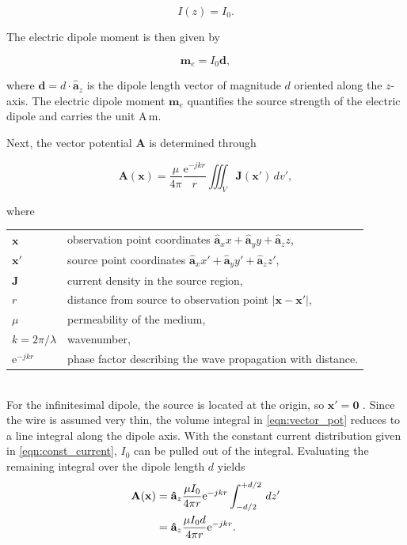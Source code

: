 \begin{equation}\label{eqn:const_current}
	{I}(z) = I_0.
\end{equation}

The electric dipole moment is then given by

\begin{equation}
	\mathbf{m}_e = I_0 \mathbf{d},
	\label{eqn:m_e_def}
\end{equation}

where $\mathbf{d} = d \cdot \hat{\mathbf{a}}_z$ is the dipole length 
vector of magnitude $d$ oriented along the $z$-axis. The electric dipole 
moment $\mathbf{m}_e$ quantifies the source strength of the electric 
dipole and carries the unit $\mathrm{A}\,\mathrm{m}$.

Next, the vector potential $\mathbf{A}$ is determined through

\begin{equation}
	\mathbf{A}(\mathbf{x})=\frac{\mu}{4\pi}\frac{\mathrm{e}^{-jkr}}{r}\iiint_V \mathbf{J}(\mathbf{x'})\,dv',
	\label{eqn:vector_pot}
\end{equation}

where\\[0.5em]
\begin{tabular}{p{3.5cm}l}
	$\mathbf{x}$            & observation point coordinates $\mathbf{\hat{a}}_x x + \mathbf{\hat{a}}_y y + \mathbf{\hat{a}}_z z$, \\[0.3em]
	$\mathbf{x'}$           & source point coordinates $\mathbf{\hat{a}}_x x' + \mathbf{\hat{a}}_y y' + \mathbf{\hat{a}}_z z'$, \\[0.3em]
	$\mathbf{J}$            & current density in the source region, \\[0.3em]
	$r$                     & distance from source to observation point $|\mathbf{x} - \mathbf{x'}|$, \\[0.3em]
	$\mu$                   & permeability of the medium, \\[0.3em]
	$k = 2\pi/\lambda$\hspace{2cm}      & wavenumber, \\[0.3em]
	$\mathrm{e}^{-jkr}$      & phase factor describing the wave propagation with distance.
\end{tabular}\\

For the infinitesimal dipole, the source is located at the origin, so $\mathbf{x'}=\mathbf{0}$ \cite[p.~152]{Balanis_1997}. Since the wire is assumed very thin, the volume integral in \eqref{eqn:vector_pot} reduces to a line integral along the dipole axis. With the constant current distribution 
given in \eqref{eqn:const_current}, $I_0$ can be pulled out of the integral. Evaluating the remaining integral over the dipole 
length $d$ yields \cite[p.~153]{Balanis_1997}
\begin{align}
	\mathbf{A}(\mathbf{x}) &= \mathbf{\hat{a}}_z\frac{\mu I_0}{4\pi r}\mathrm{e}^{-jkr}
	\int_{-d/2}^{+d/2}\,dz' \notag\\
	&= \mathbf{\hat{a}}_z \frac{\mu I_0 d}{4\pi r}\mathrm{e}^{-jkr}.
	\label{eqn:a_e_inf}
\end{align}

